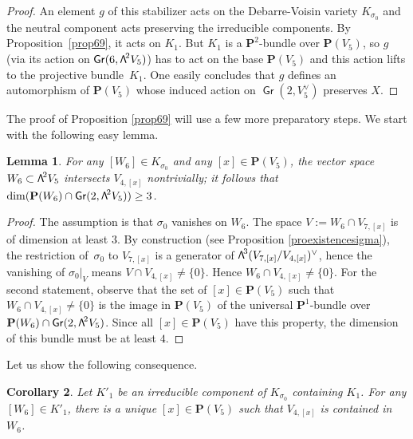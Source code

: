 \documentclass[11pt]{article}
\newtheorem{lemm}{Lemma}[section]
\newtheorem{coro}[lemm]{Corollary}
\theoremstyle{definition}
\renewcommand\P{{\mathbf P}}\let\PP\P
\DeclareMathOperator{\Gr}{\mathsf{Gr}}
\let\dual\vee
\newcommand\bw[1]{{\hbox{\large$\mathsf{\Lambda}$}^{\!#1}}}
\begin{document}
\begin{proof}
An element $g$ of this stabilizer acts on the Debarre-Voisin variety
$K_{\sigma_0}$ and the neutral component acts preserving the irreducible components. By Proposition~\ref{prop69}, it acts on $K_1$. But
$K_1$ is a $\P^2$-bundle over $\P(V_5)$, so $g$ (via its action
on $\Gr(6,\bw2V_5)$) has to act on
the base $\P(V_5)$ and this action lifts to the projective bundle~$K_1$.
One easily concludes that $g$ defines an automorphism of $\P(V_5)$ whose induced action on $\Gr(2,V_5^\dual)$
preserves $X$.
\end{proof}

The proof of Proposition \ref{prop69} will use a few more preparatory steps.
We start with the
following easy lemma.

\begin{lemm}\label{lepourV6dansKsigma0}
For any $[W_6]\in K_{\sigma_0}$ and any
$[x]\in \P(V_5)$,
the vector space $W_6\subset \bw2V_5$ intersects $V_{4,[x]}$ nontrivially; it follows that $\dim (\P(W_6)\cap \Gr(2, \bw2V_5))\geq 3$.
\end{lemm}

\begin{proof} The assumption is that $\sigma_0$ vanishes on $W_6$. The space
$V:=W_{6}\cap V_{7,[x]}$ is of dimension at least $3$. By construction
(see Proposition \ref{proexistencesigma}), the restriction of~$\sigma_0$ to
$V_{7,[x]}$ is a generator of $\bw{3}(V_{7,[x]}/V_{4,[x]})^\dual$, hence the vanishing of
$\sigma_0\vert_{V}$ means \hbox{$V\cap V_{4,[x]}\ne \{0\}$}. Hence $W_6\cap V_{4,[x]}\ne \{0\}$. For the second statement, observe that the set of
$[x]\!\in\!\P(V_5)$ such that~\hbox{$W_6\!\cap\!V_{4,[x]}\!\ne\!\{0\}$} is the image in
$\P(V_5)$ of the universal $\P^1$-bundle over $\P(W_6)\cap\nobreak \Gr(2, \bw2V_5)$.
Since all $[x]\in \P(V_5)$ have this property, the dimension of this bundle must be at least $4$.
\end{proof}

Let us show the following consequence.

\begin{coro} \label{coropourKsigma01007}
Let $K'_1$ be an irreducible component of $K_{\sigma_0}$ containing $K_1$. For any $[W_6]\in K'_1$, there is
a unique $[x]\in \P(V_5)$ such that $V_{4,[x]} $ is contained in $W_6$.
\end{coro}
\end{document}
